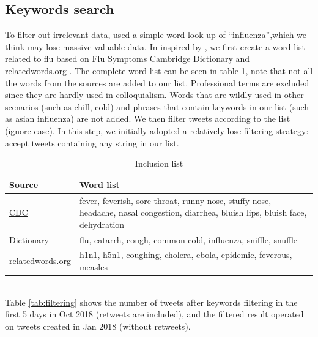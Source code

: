 \subsection{Keywords search}
\label{sec:Keywords search}
To filter out irrelevant data, \cite{aramaki2011twitter} used a simple word look-up of ``influenza'',which we think may lose massive valuable data. In inspired by \cite{lamb2013separating,lampos2010flu}, we first create a word list related to flu based on Flu Symptoms \cite{cdc.symp} Cambridge Dictionary \cite{cambridge} and relatedwords.org \cite{relatedwords.org}. The complete word list can be seen in table \ref{tab:words list}, note that not all the words from the sources are added to our list. Professional terms are excluded since they are hardly used in colloquialism. Words that are wildly used in other scenarios (such as chill, cold) and phrases that contain keywords in our list (such as asian influenza) are not added. We then filter tweets according to the list (ignore case). In this step, we initially adopted a relatively lose filtering strategy: accept tweets containing any string in our list. 
\begin{table}[!htbp]
    \centering
    \hspace{0.5cm}
    \begin{tabular}{p{90pt}p{320pt}}
        Source & Word list \\ \hline
        \href{https://www.cdc.gov/flu/symptoms/symptoms.htm}{CDC} &  fever, feverish, sore throat, runny nose, stuffy nose, headache, nasal congestion, diarrhea, bluish lips, bluish face, dehydration\\ \hline
        \href{https://dictionary.cambridge.org/us/topics/disease-and-illness/colds-and-flu/}{Dictionary} & flu, catarrh, cough, common cold, influenza, sniffle, snuffle\\ \hline
        \href{https://relatedwords.org/relatedto/flu}{relatedwords.org} & h1n1, h5n1, coughing, cholera, ebola, epidemic, feverous, measles \\ \hline
    \end{tabular}
    \caption{Inclusion list}
    \label{tab:words list}
\end{table}
\\
Table \ref{tab:filtering} shows the number of tweets after keywords filtering in the first 5 days in Oct 2018 (retweets are included), and the filtered result operated on tweets created in Jan 2018 (without retweets). 
